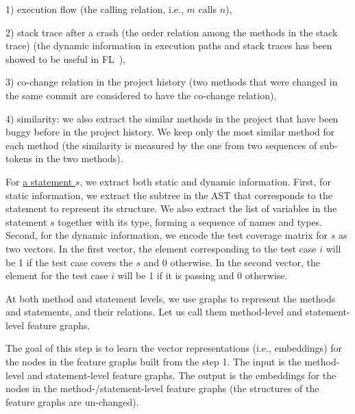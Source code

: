 1) execution flow (the calling relation, i.e., $m$ calls $n$),

2) stack trace after a crash (the order relation among the methods in
the stack trace) (the dynamic information in execution paths and stack
traces has been showed to be useful in FL~\cite{icse21-fl,DeepFL}),

3) co-change relation in the project history (two methods that were
changed in the same commit are considered to have the co-change
relation),

4) similarity: we also extract the similar methods in the project that
have been buggy before in the project history. We keep only the most
similar method for each method (the similarity is measured by the one
from two sequences of sub-tokens in the two methods).

For \underline{a statement $s$}, we extract both static and dynamic
information. First, for static information, we extract the subtree in
the AST that corresponds to the statement to represent its
structure. We also extract the list of variables in the statement $s$
together with its type, forming a sequence of names and types. Second,
for the dynamic information, we encode the test coverage matrix for
$s$ as two vectors. In the first vector, the element corresponding to
the test case $i$ will be 1 if the test case covers the $s$ and 0
otherwise. In the second vector, the element for the test case $i$
will be 1 if it is passing and 0 otherwise.

At both method and statement levels, we use graphs to represent
the methods and statements, and their relations. Let us call
them method-level and statement-level feature graphs.

\vspace{3pt}
The goal of this step is to learn the vector representations
(i.e., embeddings) for the nodes in the feature graphs built from the
step 1. The input is the method-level and statement-level feature
graphs. The output is the embeddings for the nodes in the
method-/statement-level feature graphs (the structures of the feature
graphs are un-changed).


